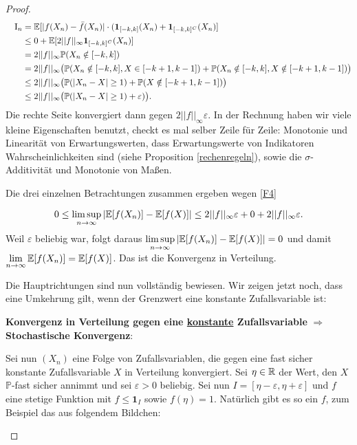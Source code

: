 \begin{proof}
			 \begin{align*}
			 	\quad \text{I}_n 
				&= \mathbb{E}[|f(X_n) - \bar f(X_n)|\cdot (\mathbf{1}_{[-k,k]}(X_n)+\mathbf{1}_{[-k,k]^C}(X_n)]\\
				&\leq 0+ \mathbb{E}[ 2||f||_\infty \mathbf 1_{[-k,k]^C}(X_n)]\\
				&=2|| f|| _\infty \mathbb P(X_n \notin [-k,k])\\
				&=2||f||_\infty \big( \mathbb P(X_n\notin [-k,k], X\in [-k+1,k-1])+\mathbb P(X_n\notin [-k,k],X\notin  [-k+1,k-1]) \big)\\
				&\leq 2||f||_\infty \big( \mathbb P(|X_n-X|\geq 1)+\mathbb P(X\notin [-k+1,k-1]) \big)\\
				&\leq 2||f||_\infty \big( \mathbb P(|X_n-X|\geq 1)+\varepsilon) \big).
			 \end{align*}
			Die rechte Seite konvergiert dann gegen $2||f||_\infty \varepsilon$. In der Rechnung haben wir viele kleine Eigenschaften benutzt, checkt es mal selber Zeile f\"ur Zeile: Monotonie und Linearit\"at von Erwartungswerten, dass Erwartungswerte von Indikatoren Wahrscheinlichkeiten sind (siehe Proposition \ref{rechenregeln}), sowie die $\sigma$-Additivit\"at und Monotonie von Ma\ss en. \smallskip			 
			 
			 Die drei einzelnen Betrachtungen zusammen ergeben wegen \eqref{F4}
			 
			  \[0\leq \limsup\limits_{n \to \infty} |\mathbb{E}[f(X_n)] - \mathbb{E}[f(X)]| \leq 2 ||f||_{\infty} \varepsilon + 0 + 2||f||_{\infty}\varepsilon. \] 
			 Weil $\varepsilon$ beliebig war, folgt daraus $\limsup\limits_{n \to \infty} |\mathbb{E}[f(X_n)] - \mathbb{E}[f(X)]|=0$ und damit $ \lim\limits_{n \to \infty} \mathbb{E}[f(X_n)] = \mathbb{E}[f(X)]$. Das ist die Konvergenz in Verteilung. \smallskip
			 
Die Hauptrichtungen sind nun vollst\"andig bewiesen. Wir zeigen jetzt noch, dass eine Umkehrung gilt, wenn der Grenzwert eine konstante Zufallsvariable ist:\smallskip

\textbf{Konvergenz in Verteilung gegen eine \underline{konstante} Zufallsvariable} $\Rightarrow$ \textbf{ Stochastische Konvergenz}:

Sei nun $(X_n)$ eine Folge von Zufallsvariablen, die gegen eine fast sicher konstante Zufallsvariable $X$ in Verteilung konvergiert. Sei $\eta\in\mathbb{R}$ der Wert, den $X$ $\mathbb P$-fast sicher annimmt und sei $\varepsilon>0$ beliebig. Sei nun $I=[\eta-\varepsilon, \eta+\varepsilon]$ und $f$ eine stetige Funktion mit $f\leq \mathbf 1_I$ sowie $f(\eta)=1$. Nat\"urlich gibt es so ein $f$, zum Beispiel das aus folgendem Bildchen:
\begin{center}




\end{center}
\end{proof}

